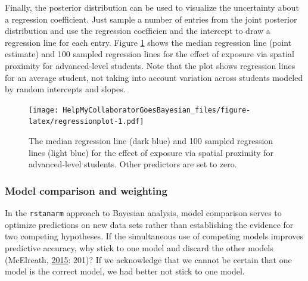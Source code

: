 \documentclass[doc]{apa6}
\newenvironment{Shaded}{\begin{snugshade}}{\end{snugshade}}
\newcommand{\KeywordTok}[1]{\textcolor[rgb]{0.13,0.29,0.53}{\textbf{#1}}}
\newcommand{\DataTypeTok}[1]{\textcolor[rgb]{0.13,0.29,0.53}{#1}}
\newcommand{\DecValTok}[1]{\textcolor[rgb]{0.00,0.00,0.81}{#1}}
\newcommand{\StringTok}[1]{\textcolor[rgb]{0.31,0.60,0.02}{#1}}
\newcommand{\OperatorTok}[1]{\textcolor[rgb]{0.81,0.36,0.00}{\textbf{#1}}}
\newcommand{\NormalTok}[1]{#1}
\begin{document}
\begin{Shaded}
\end{Shaded}

Finally, the posterior distribution can be used to visualize the
uncertainty about a regression coefficient. Just sample a number of
entries from the joint posterior distribution and use the regression
coefficien and the intercept to draw a regression line for each entry.
Figure \ref{fig:regressionplot} shows the median regression line (point
estimate) and 100 sampled regression lines for the effect of exposure
via spatial proximity for advanced-level students. Note that the plot
shows regression lines for an average student, not taking into account
variation across students modeled by random intercepts and slopes.

\begin{figure}[H]
\centering
\texttt{[image: HelpMyCollaboratorGoesBayesian\_files/figure-latex/regressionplot-1.pdf]}
\caption{\label{fig:regressionplot}The median regression line (dark blue)
and 100 sampled regression lines (light blue) for the effect of exposure
via spatial proximity for advanced-level students. Other predictors are
set to zero.}
\end{figure}

\subsubsection{Model comparison and
weighting}\label{model-comparison-and-weighting}

In the \texttt{rstanarm} approach to Bayesian analysis, model comparison
serves to optimize predictions on new data sets rather than establishing
the evidence for two competing hypotheses. If the simultaneous use of
competing models improves predictive accuracy, why stick to one model
and discard the other models (McElreath,
\protect\hyperlink{ref-McElreathStatisticalRethinkingBayesian2015}{2015}:
201)? If we acknowledge that we cannot be certain that one model is the
correct model, we had better not stick to one model.
\end{document}
